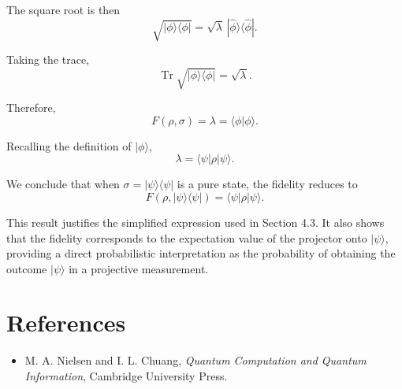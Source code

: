 \documentclass[a4paper]{article}
\begin{document}
The square root is then
\[
\sqrt{|\phi\rangle\langle\phi|}
=
\sqrt{\lambda}\,|\hat{\phi}\rangle\langle\hat{\phi}|.
\]

Taking the trace,
\[
\operatorname{Tr}\sqrt{|\phi\rangle\langle\phi|}
=
\sqrt{\lambda}.
\]

Therefore,
\[
F(\rho,\sigma)
=
\lambda
=
\langle \phi | \phi \rangle.
\]

Recalling the definition of $|\phi\rangle$,
\[
\lambda
=
\langle \psi | \rho | \psi \rangle.
\]

\medskip

We conclude that when $\sigma = |\psi\rangle\langle\psi|$ is a pure state, the fidelity reduces to
\[
F(\rho,|\psi\rangle\langle\psi|)
=
\langle \psi | \rho | \psi \rangle.
\]

\medskip

This result justifies the simplified expression used in Section 4.3. It also shows that the fidelity corresponds to the expectation value of the projector onto $|\psi\rangle$, providing a direct probabilistic interpretation as the probability of obtaining the outcome $|\psi\rangle$ in a projective measurement.
\section{References}

\begin{itemize}
    \item M. A. Nielsen and I. L. Chuang, \textit{Quantum Computation and Quantum Information}, Cambridge University Press.
\end{itemize}
\end{document}
